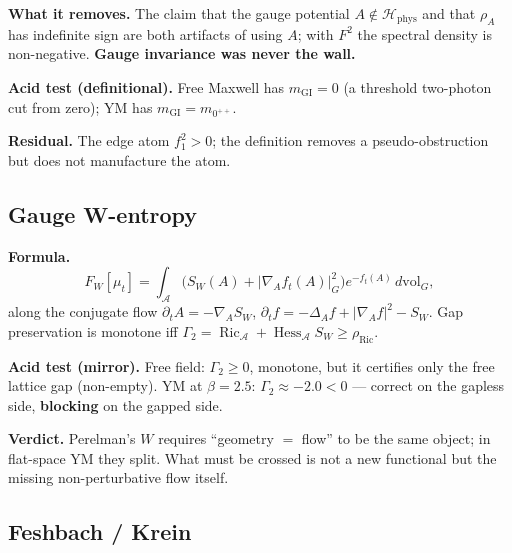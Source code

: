 \textbf{What it removes.} The claim that the gauge potential $A\notin \mathcal{H}_{\mathrm{phys}}$ and
that $\rho_A$ has indefinite sign are both artifacts of using $A$; with $F^2$ the spectral
density is non-negative. \textbf{Gauge invariance was never the wall.}

\textbf{Acid test (definitional).} Free Maxwell has $m_{\mathrm{GI}}=0$ (a threshold two-photon
cut from zero); YM has $m_{\mathrm{GI}}=m_{0^{++}}$.

\textbf{Residual.} The edge atom $f_1^2>0$; the definition removes a pseudo-obstruction but does
not manufacture the atom.

\subsection{Gauge W-entropy}

\textbf{Formula.}
\begin{equation}
F_W[\mu_t]=\int_{\mathcal{A}}\bigl(S_W(A)+|\nabla_Af_t(A)|_G^2\bigr)e^{-f_t(A)}\,d\mathrm{vol}_G ,
\label{eq:wentropy}
\end{equation}
along the conjugate flow $\partial_tA=-\nabla_AS_W$,
$\partial_tf=-\Delta_Af+|\nabla_Af|^2-S_W$. Gap preservation is monotone iff
$\Gamma_2=\operatorname{Ric}_{\mathcal{A}}+\operatorname{Hess}_{\mathcal{A}}S_W\ge\rho_{\mathrm{Ric}}$.

\textbf{Acid test (mirror).} Free field: $\Gamma_2\ge0$, monotone, but it certifies only the
free lattice gap (non-empty). YM at $\beta=2.5$: $\Gamma_2\approx-2.0<0$ --- correct on the
gapless side, \textbf{blocking} on the gapped side.

\textbf{Verdict.} Perelman's $W$ requires ``geometry $=$ flow'' to be the same object; in
flat-space YM they split. What must be crossed is not a new functional but the missing
non-perturbative flow itself.

\subsection{Feshbach / Krein}

